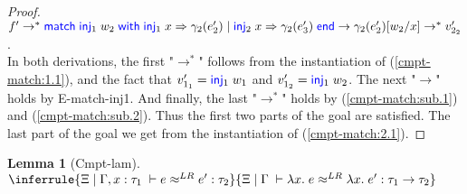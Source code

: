 \documentclass[twoside,11pt,openright]{report}
\newtheorem{lemma}[theorem]{Lemma}
\theoremstyle{definition}
\newcommand{\Keyword}[1]{{\color{blue} \mathsf{#1}}}
\newcommand{\var}{x}
\newcommand{\expr}{e}
\newcommand{\val}{v}
\newcommand{\valB}{w}
\newcommand{\Inj}[1]{\Keyword{inj}_{#1}\;}
\newcommand{\MatchCmd}{\Keyword{match}}
\newcommand{\WithCmd}{\Keyword{with}}
\newcommand{\EndCmd}{\Keyword{end}}
\def\Match#1with#2=>#3|#4=>#5end{\MatchCmd{}\;#1\;\WithCmd{}\;#2\Rightarrow#3 \;|\;#4\Rightarrow#5\;\EndCmd{}}
\newcommand{\subst}[3]{#1{\left[#3 \middle/ #2 \right]}}
\newcommand{\Tfunc}[2]{#1 \rightarrow #2}
\newcommand{\typ}{\tau}
\newcommand{\venv}{\Gamma}
\newcommand{\tenv}{\Xi}
\newcommand{\jdgRel}[6]{#1 \; | \; #2 \; \vdash #3 \approx^{#4} #5 : #6}
\newcommand{\step}{\rightarrow}
\newcommand{\stepS}{\rightarrow^*}
\newcommand{\LogRel}[5]{\jdgRel{#1}{#2}{#3}{LR}{#4}{#5}}
\begin{document}
\begin{proof}
  $f' \stepS \Match \Inj{1} \valB_2 with \Inj{1} \var => \gamma_2(\expr'_2) | \Inj{2} \var => \gamma_2(\expr'_3) end \step \subst{\gamma_2(\expr'_2)}{\var}{\valB_2} \stepS \val'_{2_2}$.\\
  In both derivations, the first "$\stepS$" follows from the instantiation of (\ref*{cmpt-match:1.1}), and the fact that $\val'_{1_1} = \Inj{1} \valB_1$ and $\val'_{1_2} = \Inj{1} \valB_2$. The next "$\step$" holds by E-match-inj1. And finally, the last "$\stepS$" holds by (\ref*{cmpt-match:sub.1}) and (\ref*{cmpt-match:sub.2}).
  Thus the first two parts of the goal are satisfied. The last part of the goal we get from the instantiation of (\ref*{cmpt-match:2.1}).
\end{proof}


\begin{lemma}[Cmpt-lam]
  $\inferrule
  { \LogRel{\tenv}{\venv, x : \typ_1}{\expr}{\expr'}{\typ_2} }
  { \LogRel{\tenv}{\venv}{\fun \var . \expr}{\fun \var . \expr'}{\Tfunc{\typ_1}{\typ_2}} }$
\end{lemma}
\end{document}
